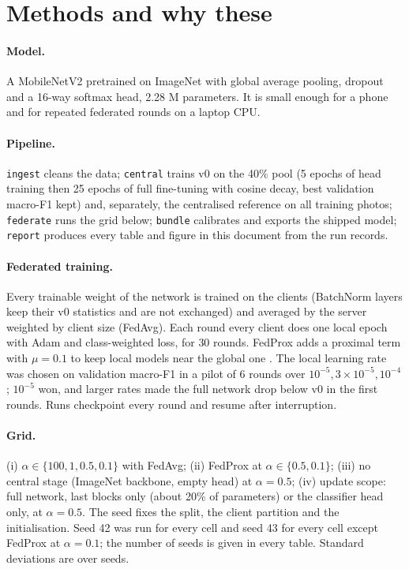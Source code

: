 \documentclass[11pt,a4paper]{article}
\begin{document}
\section{Methods and why these}
\paragraph{Model.} A MobileNetV2 pretrained on ImageNet \citep{sandler2018mobilenetv2} with global average pooling, dropout and a 16-way softmax head, 2.28 M parameters. It is small enough for a phone and for repeated federated rounds on a laptop CPU.

\paragraph{Pipeline.} \texttt{ingest} cleans the data; \texttt{central} trains v0 on the 40\% pool (5 epochs of head training then 25 epochs of full fine-tuning with cosine decay, best validation macro-F1 kept) and, separately, the centralised reference on all training photos; \texttt{federate} runs the grid below; \texttt{bundle} calibrates and exports the shipped model; \texttt{report} produces every table and figure in this document from the run records.

\paragraph{Federated training.} Every trainable weight of the network is trained on the clients (BatchNorm layers keep their v0 statistics and are not exchanged) and averaged by the server weighted by client size (FedAvg). Each round every client does one local epoch with Adam and class-weighted loss, for 30 rounds. FedProx adds a proximal term with $\mu=0.1$ to keep local models near the global one \citep{li2020federated}. The local learning rate was chosen on validation macro-F1 in a pilot of 6 rounds over $10^{-5}, 3\times10^{-5}, 10^{-4}$; $10^{-5}$ won, and larger rates made the full network drop below v0 in the first rounds. Runs checkpoint every round and resume after interruption.

\paragraph{Grid.} (i) $\alpha\in\{100,1,0.5,0.1\}$ with FedAvg; (ii) FedProx at $\alpha\in\{0.5,0.1\}$; (iii) no central stage (ImageNet backbone, empty head) at $\alpha=0.5$; (iv) update scope: full network, last blocks only (about 20\% of parameters) or the classifier head only, at $\alpha=0.5$. The seed fixes the split, the client partition and the initialisation. Seed 42 was run for every cell and seed 43 for every cell except FedProx at $\alpha=0.1$; the number of seeds is given in every table. Standard deviations are over seeds.
\end{document}
